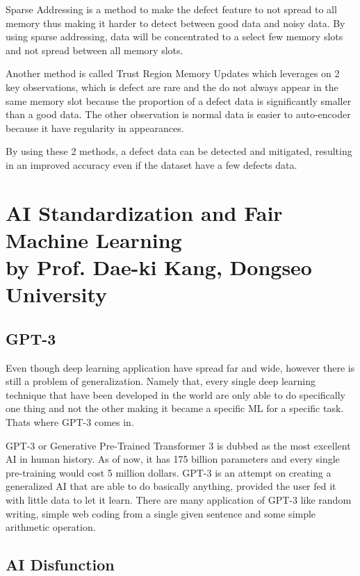 \documentclass[12pt, a4paper]{article}
\begin{document}
Sparse Addressing is a method to make the defect feature to not spread to all memory thus making it harder to detect between good data and noisy data. By using sparse addressing, data will be concentrated to a select few memory slots and not spread between all memory slots.

Another method is called Trust Region Memory Updates which leverages on 2 key observations, which is defect are rare and the do not always appear in the same memory slot because the proportion of a defect data is significantly smaller than a good data. The other observation is normal data is easier to auto-encoder because it have regularity in appearances.

By using these 2 methods, a defect data can be detected and mitigated, resulting in an improved accuracy even if the dataset have a few defects data.

\section*{AI Standardization and Fair Machine Learning \\ \footnotesize by Prof. Dae-ki Kang, Dongseo University}

\subsection*{GPT-3}

Even though deep learning application have spread far and wide, however there is still a problem of generalization. Namely that, every single deep learning technique that have been developed in the world are only able to do specifically one thing and not the other making it became a specific ML for a specific task. Thats where GPT-3 comes in.

GPT-3 or Generative Pre-Trained Transformer 3 is dubbed as the most excellent AI in human history. As of now, it has 175 billion parameters and every single pre-training would cost 5 million dollars. GPT-3 is an attempt on creating a generalized AI that are able to do basically anything, provided the user fed it with little data to let it learn. There are many application of GPT-3 like random writing, simple web coding from a single given sentence and some simple arithmetic operation.

\subsection*{AI Disfunction}
\end{document}

